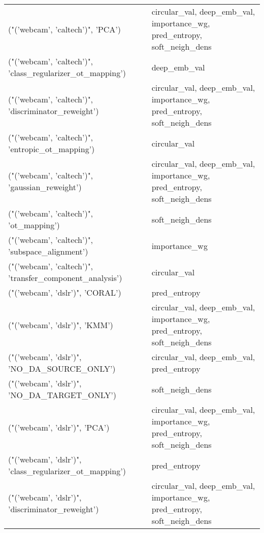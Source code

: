 \begin{tabular}{ll}
 ("('webcam', 'caltech')", 'PCA')                          & circular\_val, deep\_emb\_val, importance\_wg, pred\_entropy, soft\_neigh\_dens \\
 ("('webcam', 'caltech')", 'class\_regularizer\_ot\_mapping') & deep\_emb\_val                                                             \\
 ("('webcam', 'caltech')", 'discriminator\_reweight')       & circular\_val, deep\_emb\_val, importance\_wg, pred\_entropy, soft\_neigh\_dens \\
 ("('webcam', 'caltech')", 'entropic\_ot\_mapping')          & circular\_val                                                             \\
 ("('webcam', 'caltech')", 'gaussian\_reweight')            & circular\_val, deep\_emb\_val, importance\_wg, pred\_entropy, soft\_neigh\_dens \\
 ("('webcam', 'caltech')", 'ot\_mapping')                   & soft\_neigh\_dens                                                          \\
 ("('webcam', 'caltech')", 'subspace\_alignment')           & importance\_wg                                                            \\
 ("('webcam', 'caltech')", 'transfer\_component\_analysis')  & circular\_val                                                             \\
 ("('webcam', 'dslr')", 'CORAL')                           & pred\_entropy                                                             \\
 ("('webcam', 'dslr')", 'KMM')                             & circular\_val, deep\_emb\_val, importance\_wg, pred\_entropy, soft\_neigh\_dens \\
 ("('webcam', 'dslr')", 'NO\_DA\_SOURCE\_ONLY')               & circular\_val, deep\_emb\_val, pred\_entropy                                 \\
 ("('webcam', 'dslr')", 'NO\_DA\_TARGET\_ONLY')               & soft\_neigh\_dens                                                          \\
 ("('webcam', 'dslr')", 'PCA')                             & circular\_val, deep\_emb\_val, importance\_wg, pred\_entropy, soft\_neigh\_dens \\
 ("('webcam', 'dslr')", 'class\_regularizer\_ot\_mapping')    & pred\_entropy                                                             \\
 ("('webcam', 'dslr')", 'discriminator\_reweight')          & circular\_val, deep\_emb\_val, importance\_wg, pred\_entropy, soft\_neigh\_dens \\

\end{tabular}

